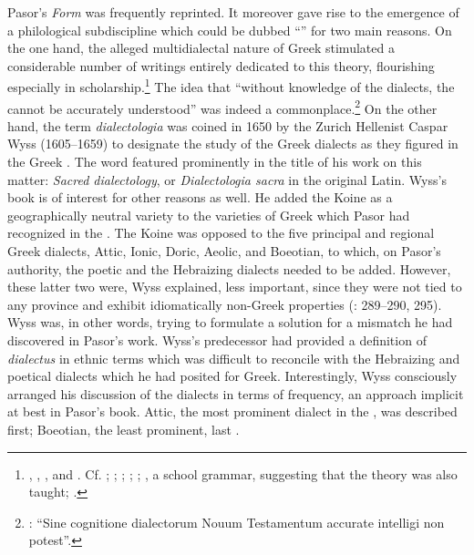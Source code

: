 Pasor’s \textit{Form} was frequently reprinted. It moreover gave rise to the emergence of a philological subdiscipline which could be dubbed “” for two main reasons. On the one hand, the alleged multidialectal nature of  Greek stimulated a considerable number of writings entirely dedicated to this theory, flourishing especially in  scholarship.\footnote{\citet{Wyss1650}, \citet{Olearius1668}, \citet{Leusden1670}, and \citet{Nibbe1755}. Cf. \citet[347]{Parr1686}; \citet[18--19]{Von1705}; \citet[9--10]{Florinus1707}; \citet[\textsc{d.2}\textsc{\textsuperscript{r}}, \textsc{d.5}\textsc{\textsuperscript{v}}]{Thryllitsch1709}; \citet[18]{Reinhard1724}; \citet[121--122]{Holmes1735}, a school grammar, suggesting that the theory was also taught; \citet[136--137]{Walch1772}.} The idea that “without knowledge of the dialects, the  cannot be accurately understood” was indeed a commonplace.\footnote{\citet[\textsc{d.5}\textsc{\textsuperscript{v}}]{Thryllitsch1709}: “Sine cognitione dialectorum Nouum Testamentum accurate intelligi non potest”.} On the other hand, the term \textit{dialectologia} was coined in 1650 by the Zurich Hellenist Caspar Wyss (1605–1659) to designate the study of the Greek dialects as they figured in the Greek . The word featured prominently in the title of his work on this matter: \textit{Sacred dialectology}, or \textit{Dialectologia sacra} in the original Latin. Wyss’s book is of interest for other reasons as well. He added the Koine as a geographically neutral variety to the varieties of Greek which Pasor had recognized in the  \citep[3]{Wyss1650}. The Koine was opposed to the five principal and regional Greek dialects, Attic, Ionic, Doric, Aeolic, and Boeotian, to which, on Pasor’s authority, the poetic and the Hebraizing dialects needed to be added. However, these latter two were, Wyss explained, less important, since they were not tied to any province and exhibit idiomatically non-Greek properties (\citealt{Wyss1650}: 289–290, 295). Wyss was, in other words, trying to formulate a solution for a mismatch he had discovered in Pasor’s work. Wyss’s predecessor had provided a definition of \textit{dialectus} in ethnic terms which was difficult to reconcile with the Hebraizing and poetical dialects which he had posited for  Greek. Interestingly, Wyss consciously arranged his discussion of the  dialects in terms of frequency, an approach implicit at best in Pasor’s book. Attic, the most prominent dialect in the , was described first; Boeotian, the least prominent, last \citep[4]{Wyss1650}.

